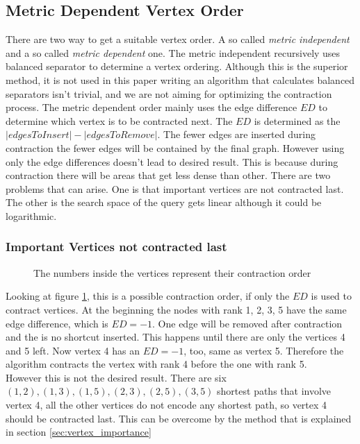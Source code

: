 \subsection{Metric Dependent Vertex Order}
There are two way to get a suitable vertex order. A so called \textit{metric independent} and a so called \textit{metric dependent} one. The metric independent recursively uses balanced separator to determine a vertex ordering\cite{CCH}. Although this is the superior method, it is not used in this paper writing an algorithm that calculates balanced separators isn't trivial, and we are not aiming for optimizing the contraction process. 
The metric dependent order mainly uses the edge difference $ED$ to determine which vertex is to be contracted next. The $ED$ is determined as the $|edges To Insert| - |edges To Remove|$. The fewer edges are inserted during contraction the fewer edges will be contained by the final graph. However using only the edge differences doesn't lead to desired result. This is because during contraction there will be areas that get less dense than other. There are two problems that can arise. One is that important vertices are not contracted last. The other is the search space of the query gets linear although it could be logarithmic.

\subsubsection{Important Vertices not contracted last}\label{sec:not_contracted_last}

\begin{figure}
    \centering
    
    \caption{The numbers inside the vertices represent their contraction order}
    \label{fig:not_contracted_last}
\end{figure}

Looking at figure \ref{fig:not_contracted_last}, this is a possible contraction order, if only the $ED$ is used to contract vertices. At the beginning the nodes with rank 1, 2, 3, 5 have the same edge difference, which is $ED = -1$. One edge will be removed after contraction and the is no shortcut inserted. This happens until there are only the vertices 4 and 5 left. Now vertex 4 has an $ED=-1$, too, same as vertex 5. Therefore the algorithm contracts the vertex with rank 4 before the one with rank 5. \\
However this is not the desired result. There are six ${(1,2), (1,3), (1,5), (2,3), (2,5), (3,5)}$ shortest paths that involve vertex 4, all the other vertices do not encode any shortest path, so vertex 4 should be contracted last. This can be overcome by the method that is explained in section \ref{sec:vertex_importance}

